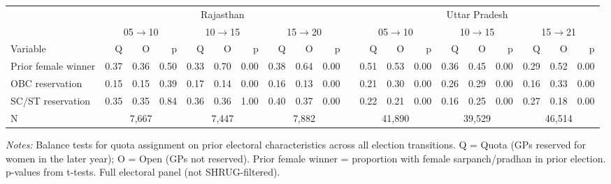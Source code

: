 {\centering\tiny
\begin{tabular}{@{}l rrr rrr rrr c rrr rrr rrr@{}}
\toprule
& \multicolumn{9}{c}{Rajasthan} & & \multicolumn{9}{c}{Uttar Pradesh} \\
\cmidrule(lr){2-10} \cmidrule(lr){12-20}
& \multicolumn{3}{c}{05$\rightarrow$10} & \multicolumn{3}{c}{10$\rightarrow$15} & \multicolumn{3}{c}{15$\rightarrow$20} & & \multicolumn{3}{c}{05$\rightarrow$10} & \multicolumn{3}{c}{10$\rightarrow$15} & \multicolumn{3}{c}{15$\rightarrow$21} \\
\cmidrule(lr){2-4} \cmidrule(lr){5-7} \cmidrule(lr){8-10} \cmidrule(lr){12-14} \cmidrule(lr){15-17} \cmidrule(lr){18-20}
Variable & Q & O & p & Q & O & p & Q & O & p & & Q & O & p & Q & O & p & Q & O & p \\
\midrule
Prior female winner & 0.37 & 0.36 & 0.50 & 0.33 & 0.70 & 0.00 & 0.38 & 0.64 & 0.00 & & 0.51 & 0.53 & 0.00 & 0.36 & 0.45 & 0.00 & 0.29 & 0.52 & 0.00 \\
OBC reservation & 0.15 & 0.15 & 0.39 & 0.17 & 0.14 & 0.00 & 0.16 & 0.13 & 0.00 & & 0.21 & 0.30 & 0.00 & 0.26 & 0.29 & 0.00 & 0.16 & 0.33 & 0.00 \\
SC/ST reservation & 0.35 & 0.35 & 0.84 & 0.36 & 0.36 & 1.00 & 0.40 & 0.37 & 0.00 & & 0.22 & 0.21 & 0.00 & 0.16 & 0.25 & 0.00 & 0.27 & 0.18 & 0.00 \\
\midrule
N & \multicolumn{3}{c}{7,667} & \multicolumn{3}{c}{7,447} & \multicolumn{3}{c}{7,882} & & \multicolumn{3}{c}{41,890} & \multicolumn{3}{c}{39,529} & \multicolumn{3}{c}{46,514} \\
\bottomrule
\end{tabular}
\par}

\vspace{0.5ex}
\parbox{\linewidth}{\scriptsize \emph{Notes:} Balance tests for quota assignment on prior electoral characteristics across all election transitions. Q = Quota (GPs reserved for women in the later year); O = Open (GPs not reserved). Prior female winner = proportion with female sarpanch/pradhan in prior election. p-values from t-tests. Full electoral panel (not SHRUG-filtered).}
